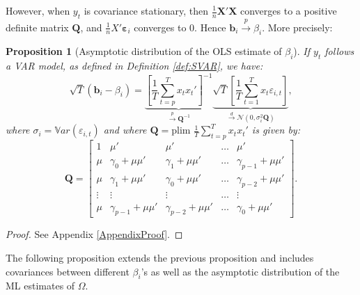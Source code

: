 \documentclass[
  12pt,
]{book}
\newtheorem{proposition}{Proposition}[chapter]
\theoremstyle{definition}
\theoremstyle{definition}
\theoremstyle{definition}
\theoremstyle{definition}
\theoremstyle{remark}
\begin{document}
However, when \(y_t\) is covariance stationary, then \(\frac{1}{n}\mathbf{X}'\mathbf{X}\) converges to a positive definite matrix \(\mathbf{Q}\), and \(\frac{1}{n}X'\boldsymbol\varepsilon_i\) converges to 0. Hence \(\mathbf{b}_i \overset{p}{\rightarrow} \beta_i\). More precisely:

\begin{proposition}[Asymptotic distribution of the OLS estimate of $\beta_i$]
\protect\hypertarget{prp:OLSVAR}{}\label{prp:OLSVAR}If \(y_t\) follows a VAR model, as defined in Definition \ref{def:SVAR}, we have:
\[
\sqrt{T}(\mathbf{b}_i-\beta_i) =  \underbrace{\left[\frac{1}{T}\sum_{t=p}^T x_t x_t' \right]^{-1}}_{\overset{p}{\rightarrow} \mathbf{Q}^{-1}}
\underbrace{\sqrt{T} \left[\frac{1}{T}\sum_{t=1}^T x_t\varepsilon_{i,t} \right]}_{\overset{d}{\rightarrow} \mathcal{N}(0,\sigma_i^2\mathbf{Q})},
\]
where \(\sigma_i = \mathbb{V}ar(\varepsilon_{i,t})\) and where \(\mathbf{Q} = \mbox{plim }\frac{1}{T}\sum_{t=p}^T x_t x_t'\) is given by:
\begin{equation}
\mathbf{Q} = \left[
\begin{array}{ccccc}
1 & \mu' &\mu' & \dots & \mu' \\
\mu & \gamma_0 + \mu\mu' & \gamma_1 + \mu\mu' & \dots & \gamma_{p-1} + \mu\mu'\\
\mu & \gamma_1 + \mu\mu' & \gamma_0 + \mu\mu' & \dots & \gamma_{p-2} + \mu\mu'\\
\vdots &\vdots &\vdots &\dots &\vdots \\
\mu & \gamma_{p-1} + \mu\mu' & \gamma_{p-2} + \mu\mu' & \dots & \gamma_{0} + \mu\mu'
\end{array}
\right].\label{eq:Qols}
\end{equation}
\end{proposition}

\begin{proof}
See Appendix \ref{AppendixProof}.
\end{proof}

The following proposition extends the previous proposition and includes covariances between different \(\beta_i\)'s as well as the asymptotic distribution of the ML estimates of \(\Omega\).
\end{document}
